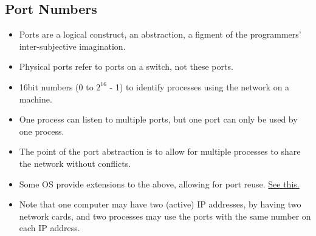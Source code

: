 \documentclass{report}
\begin{document}
\subsection{Port Numbers}
\begin{itemize}
\item Ports are a logical construct, an abstraction, a figment of the programmers' inter-subjective imagination.
\item Physical ports refer to ports on a switch, not these ports.
\item 16bit numbers (0 to $2^16$ - 1) to identify processes using the network on a machine.
\item One process can listen to multiple ports, but one port can only be used by one process.
\item The point of the port abstraction is to allow for multiple processes to share the network without conflicts.
\item Some OS provide extensions to the above, allowing for port reuse. \href{https://stackoverflow.com/questions/1694144/can-two-applications-listen-to-the-same-port}{See this.}
\item Note that one computer may have two (active) IP addresses, by having two network cards, and two processes may use
    the ports with the same number on each IP address.
\end{itemize}
\end{document}
